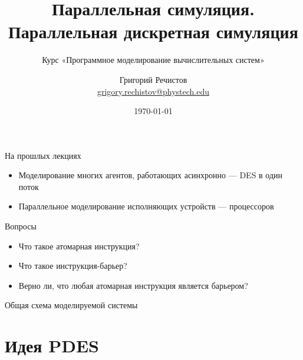 \documentclass{beamer}
\title{Параллельная симуляция. Параллельная дискретная симуляция}
\subtitle{Курс «Программное моделирование вычислительных систем»}
\author[]{Григорий Речистов \\ \small{\href{mailto:grigory.rechistov@phystech.edu}{grigory.rechistov@phystech.edu}}}
\date{\today}
\begin{document}
\begin{frame}
\titlepage
\end{frame}

\begin{frame}
\tableofcontents
\end{frame} 

\begin{frame}{На прошлых лекциях}
\begin{itemize}
\item Моделирование многих агентов, работающих асинхронно — DES в один поток
\item Параллельное моделирование исполняющих устройств — процессоров
\end{itemize}

\end{frame}

\begin{frame}{Вопросы}
\begin{itemize}
\item Что такое атомарная инструкция?\pause
\item Что такое инструкция-барьер?\pause
\item Верно ли, что любая атомарная инструкция является барьером?
\end{itemize}

\end{frame}


\begin{frame}{Общая схема моделируемой системы}

\centering


    
\end{frame}

\section{Идея PDES}
\end{document}
